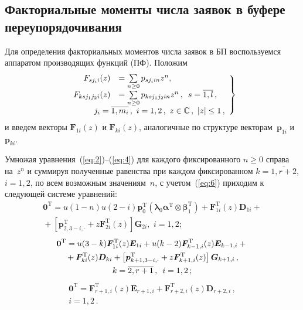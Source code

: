 \begin{multicols}{2}
\section{Факториальные моменты числа заявок в буфере переупорядочивания}

Для определения факториальных моментов числа заявок в БП воспользуемся аппаратом производящих функций (ПФ). Положим
\begin{equation}
\left.
\begin{array}{rl}
 F_{sj_ii}(z)&=\sum\limits_{n\geq 0}p_{sj_iin}z^n,\\[6pt]
 F_{ksj_1j_2i}(z)&=\sum\limits_{n\geq 0}p_{ks j_1j_2in}z^n\,,\enskip s=\overline{1,l}\,,\\
 &\!\!\!\!\!\!\!\!\!\!\!\!\!\!\!\!\!\! j_i=\overline{1,m_i}\,,\  i=1,2\,,\  z\in\mathbb{C}\,,\ |z|\leq 1\,,
\end{array}
\right \}
\label{eq:6}
\end{equation}
и введем векторы $\boldsymbol{F}_{1i}(z)$ и $\boldsymbol{F}_{ki}(z)$, аналогичные по структуре 
векторам~$\boldsymbol{p}_{1i}$ и~$\boldsymbol{p}_{ki}$.


Умножая уравнения~(\ref{eq:2})--(\ref{eq:4}) для каждого фиксированного $n\geq 0$ справа на~$z^n$ 
и суммируя полученные равенства при каждом фиксированном $k=\overline{1,r+2}$, $i=1,2$,  по всем 
возможным значениям~$n$, с учетом~(\ref{eq:6}) приходим к следующей системе уравнений:
\begin{multline}
\label{eq:7}
\boldsymbol{0}^{\mathrm{T}}=u(1-n)u(2-i)\boldsymbol{p}_0^{\mathrm{T}} \left(\boldsymbol{\lambda}_0\boldsymbol{\alpha}^{\mathrm{T}} \otimes\boldsymbol{\beta}_1^{\mathrm{T}}\right)+
\boldsymbol{F}_{1i}^{\mathrm{T}}(z)\boldsymbol{D}_{1i}+{}\\
{}+\left[\boldsymbol{p}_{2,3-i,\cdot}^{\mathrm{T}}+z\boldsymbol{F}_{2i}^{\mathrm{T}}(z)\right] \boldsymbol{G}_{2i},\,\, i=1,2;
\end{multline}
\begin{multline}
\label{eq:8}
\boldsymbol{0}^{\mathrm{T}}=u(3-k)\boldsymbol{F}_{1i}^{\mathrm{T}}(z)\boldsymbol{E}_{1i}+
u(k-2)\boldsymbol{F}_{k-1,i}^{\mathrm{T}}(z)\boldsymbol{E}_{k-1,i}+{}\\
{}+\boldsymbol{F}_{ki}^{\mathrm{T}}(z)\boldsymbol{D}_{ki}
+\left[\boldsymbol{p}_{k+1,3-i,\cdot}^{\mathrm{T}}+z\boldsymbol{F}_{k+1,i}^{\mathrm{T}}(z) \right] \boldsymbol{G}_{k+1,i}\,,\\
k=\overline{2,r+1}\,,\enskip i=1,2\,;
\end{multline}
\begin{multline}
\label{eq:9}
\boldsymbol{0}^{\mathrm{T}}=\boldsymbol{F}_{r+1,i}^{\mathrm{T}}(z)\boldsymbol{E}_{r+1,i}+
\boldsymbol{F}_{r+2,i}^{\mathrm{T}}(z)\boldsymbol{D}_{r+2,i}\,,\\ i=1,2\,.
\end{multline}


\end{multicols}
